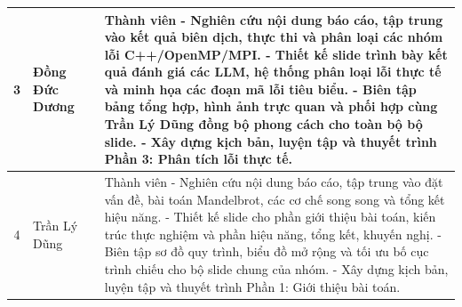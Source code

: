 \begin{table}[H]
\begin{tabularx}{\textwidth}{|c|>{\raggedright\arraybackslash}p{2.4cm}|>{\centering\arraybackslash}p{1.8cm}|>{\raggedright\arraybackslash}X|}
\hline
3 & Đồng Đức Dương & 24001659 &
Thành viên\newline
- Nghiên cứu nội dung báo cáo, tập trung vào kết quả biên dịch, thực thi và phân loại các nhóm lỗi C++/OpenMP/MPI.\newline
- Thiết kế slide trình bày kết quả đánh giá các LLM, hệ thống phân loại lỗi thực tế và minh họa các đoạn mã lỗi tiêu biểu.\newline
- Biên tập bảng tổng hợp, hình ảnh trực quan và phối hợp cùng Trần Lý Dũng đồng bộ phong cách cho toàn bộ bộ slide.\newline
- Xây dựng kịch bản, luyện tập và thuyết trình Phần 3: Phân tích lỗi thực tế. \\[3pt]
\hline
4 & Trần Lý Dũng & 24001658 &
Thành viên\newline
- Nghiên cứu nội dung báo cáo, tập trung vào đặt vấn đề, bài toán Mandelbrot, các cơ chế song song và tổng kết hiệu năng.\newline
- Thiết kế slide cho phần giới thiệu bài toán, kiến trúc thực nghiệm và phần hiệu năng, tổng kết, khuyến nghị.\newline
- Biên tập sơ đồ quy trình, biểu đồ mở rộng và tối ưu bố cục trình chiếu cho bộ slide chung của nhóm.\newline
- Xây dựng kịch bản, luyện tập và thuyết trình Phần 1: Giới thiệu bài toán. \\[3pt]
\hline
\end{tabularx}
\endgroup
\end{table}
